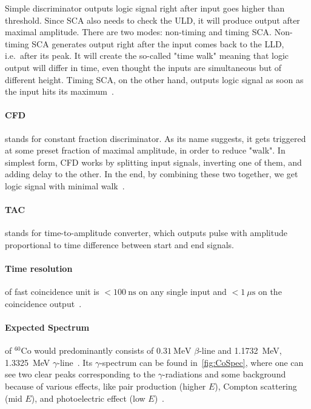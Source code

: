 Simple discriminator outputs logic signal right after input goes higher than threshold. Since SCA also needs to check the ULD, it will produce output after maximal amplitude. There are two modes: non-timing and timing SCA. Non-timing SCA generates output right after the input comes back to the LLD, i.e.~after its peak. It will create the so-called "time walk" meaning that logic output will differ in time, even thought the inputs are simultaneous but of different height. Timing SCA, on the other hand, outputs logic signal as soon as the input hits its maximum~\cite{SCAmanual}.


\paragraph{CFD} stands for constant fraction discriminator. As its name suggests, it gets triggered at some preset fraction of maximal amplitude, in order to reduce "walk". In simplest form, CFD works by splitting input signals, inverting one of them, and adding delay to the other. In the end, by combining these two together, we get logic signal with minimal walk~\cite{CFDmanual}.



\paragraph{TAC} stands for time-to-amplitude converter, which outputs pulse with amplitude proportional to time difference between start and end signals.

\paragraph{Time resolution} of fast coincidence unit is $< \SI{100}{\nano\s}$ on any single input and $< \SI{1}{\mu\s}$ on the coincidence output~\cite{fastmanual}.

\paragraph{Expected Spectrum} of ${}^{60} \text{Co}$ would predominantly consists of $\SI{0.31}{\mega\eV}$ $\beta$-line and \SI{1.1732}{\mega\eV}, \SI{1.3325}{\mega\eV} $\gamma$-line~\cite{firestone}. Its $\gamma$-spectrum can be found in~\ref{fig:CoSpec}, where one can see two clear peaks corresponding to the $\gamma$-radiations and some background because of various effects, like pair production (higher $E$), Compton scattering (mid $E$), and photoelectric effect (low $E$)~\cite{wermes}.

